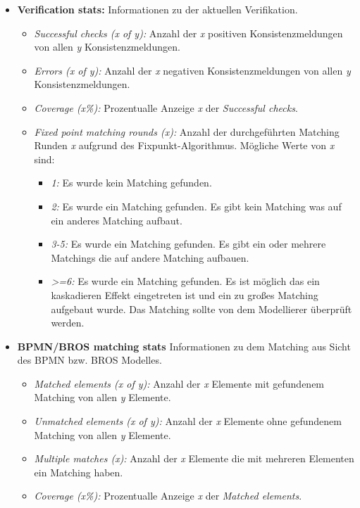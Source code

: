 \pagebreak
\begin{itemize}
    \item \textbf{Verification stats:} Informationen zu der aktuellen Verifikation.
    \begin{itemize}
        \item \emph{Successful checks (x of y):} Anzahl der \emph{x} positiven Konsistenzmeldungen von allen \emph{y} Konsistenzmeldungen. 
        \item \emph{Errors (x of y):} Anzahl der \emph{x} negativen Konsistenzmeldungen von allen \emph{y} Konsistenzmeldungen.
        \item \emph{Coverage (x\%):} Prozentualle Anzeige \emph{x} der \emph{Successful checks}.
        \item \emph{Fixed point matching rounds (x):} Anzahl der durchgeführten Matching Runden \emph{x} aufgrund des Fixpunkt-Algorithmus. Mögliche Werte von \emph{x} sind:
        \begin{itemize}
            \item \emph{1:} Es wurde kein Matching gefunden.
            \item \emph{2:} Es wurde ein Matching gefunden. Es gibt kein Matching was auf ein anderes Matching aufbaut.
            \item \emph{3-5:} Es wurde ein Matching gefunden. Es gibt ein oder mehrere Matchings die auf andere Matching aufbauen.
            \item \emph{>=6:} Es wurde ein Matching gefunden. Es ist möglich das ein kaskadieren Effekt eingetreten ist und ein zu großes Matching aufgebaut wurde. Das Matching sollte von dem Modellierer überprüft werden.
        \end{itemize}
    \end{itemize}
    \item \textbf{BPMN/BROS matching stats} Informationen zu dem Matching aus Sicht des BPMN bzw. BROS Modelles.
    \begin{itemize}
        \item \emph{Matched elements (x of y):} Anzahl der \emph{x} Elemente mit gefundenem Matching von allen \emph{y} Elemente.
        \item \emph{Unmatched elements (x of y):} Anzahl der \emph{x} Elemente ohne gefundenem Matching von allen \emph{y} Elemente.
        \item \emph{Multiple matches (x):} Anzahl der \emph{x} Elemente die mit mehreren Elementen ein Matching haben. 
        \item \emph{Coverage (x\%):} Prozentualle Anzeige \emph{x} der \emph{Matched elements}.
    \end{itemize}
\end{itemize}


